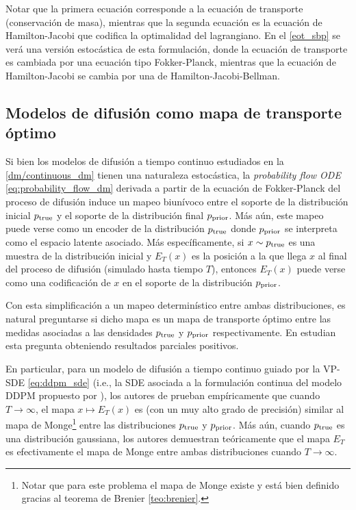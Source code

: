 Notar que la primera ecuación corresponde a la ecuación de transporte (conservación de masa), mientras que la segunda ecuación es la ecuación de Hamilton-Jacobi que codifica la optimalidad del lagrangiano. En el \autoref{eot_sbp} se verá una versión estocástica de esta formulación, donde la ecuación de transporte es cambiada por una ecuación tipo Fokker-Planck, mientras que la ecuación de Hamilton-Jacobi se cambia por una de Hamilton-Jacobi-Bellman.

\subsection{Modelos de difusión como mapa de transporte óptimo}
\label{ot/dynamic/dm}

Si bien los modelos de difusión a tiempo continuo estudiados en la \autoref{dm/continuous_dm} tienen una naturaleza estocástica, la \textit{probability flow ODE} \eqref{eq:probability_flow_dm} derivada a partir de la ecuación de Fokker-Planck del proceso de difusión induce un mapeo biunívoco entre el soporte de la distribución inicial $p_{\operatorname{true}}$ y el soporte de la distribución final $p_{\operatorname{prior}}$. Más aún, este mapeo puede verse como un encoder de la distribución $p_{\operatorname{true}}$ donde $p_{\operatorname{prior}}$ se interpreta como el espacio latente asociado. Más específicamente, si $x\sim p_{\operatorname{true}}$ es una muestra de la distribución inicial y $E_T(x)$ es la posición a la que llega $x$ al final del proceso de difusión (simulado hasta tiempo $T$), entonces $E_T(x)$ puede verse como una codificación de $x$ en el soporte de la distribución $p_{\operatorname{prior}}$.

Con esta simplificación a un mapeo determinístico entre ambas distribuciones, es natural preguntarse si dicho mapa es un mapa de transporte óptimo entre las medidas asociadas a las densidades $p_{\operatorname{true}}$ y $p_{\operatorname{prior}}$ respectivamente. En \cite{khrulkov2022understandingddpmlatentcodes} estudian esta pregunta obteniendo resultados parciales positivos.

En particular, para un modelo de difusión a tiempo continuo guiado por la VP-SDE \eqref{eq:ddpm_sde} (i.e., la SDE asociada a la formulación continua del modelo DDPM propuesto por \cite{ho2020denoising}), los autores de \cite{khrulkov2022understandingddpmlatentcodes} prueban empíricamente que cuando $T\to\infty$, el mapa $x\mapsto E_T(x)$ es (con un muy alto grado de precisión) similar al mapa de Monge\footnote{Notar que para este problema el mapa de Monge existe y está bien definido gracias al teorema de Brenier \autoref{teo:brenier}.} entre las distribuciones $p_{\operatorname{true}}$ y $p_{\operatorname{prior}}$. Más aún, cuando $p_{\operatorname{true}}$ es una distribución gaussiana, los autores demuestran teóricamente que el mapa $E_T$ es efectivamente el mapa de Monge entre ambas distribuciones cuando $T\to\infty$.

